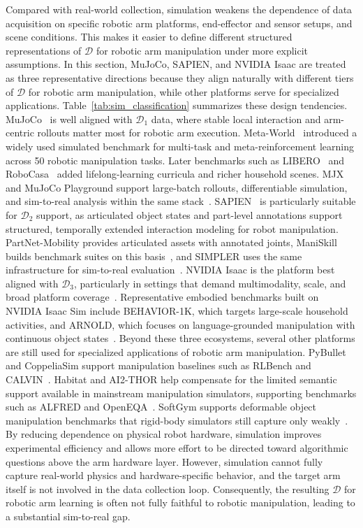 \documentclass[acmsmall,screen,review]{acmart}
\begin{document}
Compared with real-world collection, simulation weakens the dependence of data acquisition on specific robotic arm platforms, end-effector and sensor setups, and scene conditions. 
This makes it easier to define different structured representations of \(\mathcal{D}\) for robotic arm manipulation under more explicit assumptions.
In this section, MuJoCo, SAPIEN, and NVIDIA Isaac are treated as three representative directions because they align naturally with different tiers of \(\mathcal{D}\)  for robotic arm manipulation, while other platforms serve for specialized applications. Table~\ref{tab:sim_classification} summarizes these design tendencies.
MuJoCo~\cite{todorov2012mujoco} is well aligned with \(\mathcal{D}_1\) data, where stable local interaction and arm-centric rollouts matter most for robotic arm execution.
Meta-World~\cite{yu2021meta} introduced a widely used simulated benchmark for multi-task and meta-reinforcement learning across 50 robotic manipulation tasks.
Later benchmarks such as LIBERO~\cite{liu2023libero} and RoboCasa~\cite{nasiriany2024robocasa} added lifelong-learning curricula and richer household scenes. 
MJX and MuJoCo Playground support large-batch rollouts, differentiable simulation, and sim-to-real analysis within the same stack~\cite{deepmind2025playground}.
SAPIEN~\cite{xiang2020sapien} is particularly suitable for \(\mathcal{D}_2\) support, as articulated object states and part-level annotations support structured, temporally extended interaction modeling for robot manipulation.
PartNet-Mobility provides articulated assets with annotated joints, ManiSkill builds benchmark suites on this basis~\cite{tao2025maniskill3}, 
and SIMPLER uses the same infrastructure for sim-to-real evaluation~\cite{li2025simpler}.
NVIDIA Isaac is the platform best aligned with \(\mathcal{D}_3\), particularly in settings that demand multimodality, scale, and broad platform coverage~\cite{mittal2023orbit}. 
Representative embodied benchmarks built on NVIDIA Isaac Sim include BEHAVIOR-1K, which targets large-scale household activities, 
and ARNOLD, which focuses on language-grounded manipulation with continuous object states~\cite{li2024behavior1k, gong2023arnold}.
Beyond these three ecosystems, several other platforms are still used for specialized applications of robotic arm manipulation.
PyBullet and CoppeliaSim support manipulation baselines such as RLBench and CALVIN~\cite{james2020rlbench, mees2022calvin}.
Habitat and AI2-THOR help compensate for the limited semantic support available in mainstream manipulation simulators, supporting benchmarks such as ALFRED and OpenEQA~\cite{shridhar2020alfred, majumdar2024openeqa}.
SoftGym supports deformable object manipulation benchmarks that rigid-body simulators still capture only weakly~\cite{lin2021softgym}.
By reducing dependence on physical robot hardware, simulation improves experimental efficiency and allows more effort to be directed toward algorithmic questions above the arm hardware layer. 
However, simulation cannot fully capture real-world physics and hardware-specific behavior, and the target arm itself is not involved in the data collection loop.
Consequently, the resulting \(\mathcal{D}\) for robotic arm learning is often not fully faithful to robotic manipulation, leading to a substantial sim-to-real gap.
\end{document}
